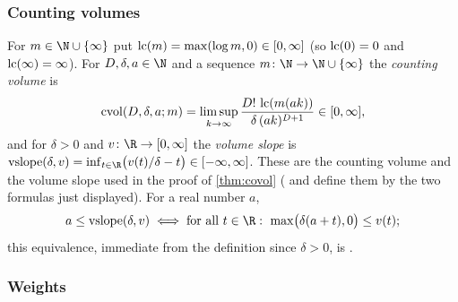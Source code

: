 \subsubsection*{Counting volumes}
For $m\in\N\cup\{\infty\}$ put $\operatorname{lc}(m)=\max(\log m,0)\in[0,\infty]$ (so $\operatorname{lc}(0)=0$ and
$\operatorname{lc}(\infty)=\infty$). For $D,\delta,a\in\N$ and a sequence $m\colon\N\to\N\cup\{\infty\}$ the
\emph{counting volume} is
\begin{equation}\label{eq:pf:deepstr:countvol}
\operatorname{cvol}(D,\delta,a;m)=\limsup_{k\to\infty}\frac{D!\,\operatorname{lc}(m(ak))}{\delta\,(ak)^{D+1}}
\in[0,\infty],
\end{equation}
and for $\delta>0$ and $v\colon\R\to[0,\infty]$ the \emph{volume slope} is
$\deepstrvsl(\delta,v)=\inf_{t\in\R}\bigl(v(t)/\delta-t\bigr)\in[-\infty,\infty]$. These are the counting volume
and the volume slope used in the proof of \cref{thm:covol} ( and
 define them by the two formulas just displayed). For a real number $a$,
\begin{equation}\label{eq:pf:deepstr:volslopeiff}
a\le\deepstrvsl(\delta,v)\iff\text{for all }t\in\R:\ \max\bigl(\delta(a+t),0\bigr)\le v(t);
\end{equation}
this equivalence, immediate from the definition since $\delta>0$, is
.

\subsubsection*{Weights}

